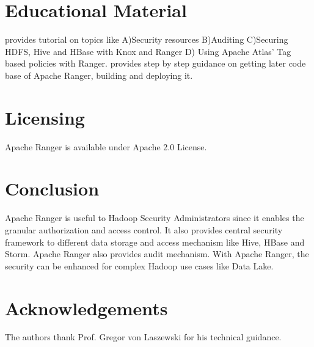 \documentclass[9pt,twocolumn,twoside]{styles/osajnl}
\begin{document}
\section{Educational Material}
\cite{www-ranger-tutorial} provides tutorial on topics like A)Security
resources B)Auditing C)Securing HDFS, Hive and HBase with Knox and Ranger D)
Using Apache Atlas' Tag based policies with Ranger.
\cite{www-ranger-quickstart} provides step by step guidance on getting later
code base of Apache Ranger, building and deploying it.

\section{Licensing}
Apache Ranger is available under Apache 2.0 License.

\section{Conclusion}
Apache Ranger is useful to Hadoop Security Administrators since it enables
the granular authorization and access control. It also provides central
security framework to different data storage and access mechanism like Hive,
HBase and Storm. Apache Ranger also provides audit mechanism. With Apache
Ranger, the security can be enhanced for complex Hadoop use cases like Data
Lake.

\section*{Acknowledgements}

The authors thank Prof. Gregor von Laszewski for his technical guidance.



\end{document}
